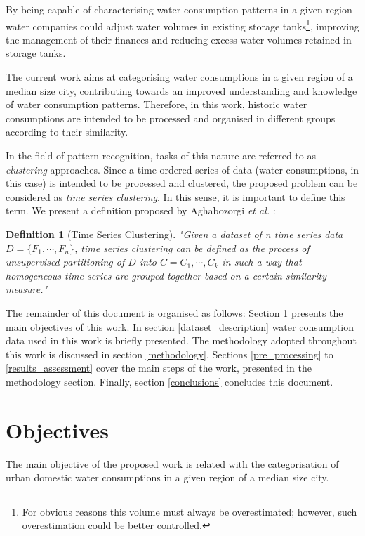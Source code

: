 \documentclass[9pt,journal,compsoc]{IEEEtran}
\newtheorem{mydef}{Definition}
\begin{document}
By being capable of characterising water consumption patterns in a given region water companies could adjust water volumes in existing storage tanks\footnote{For obvious reasons this volume must always be overestimated; however, such overestimation could be better controlled.}, improving the management of their finances and reducing excess water volumes retained in storage tanks.

The current work aims at categorising water consumptions in a given region of a median size city, contributing towards an improved understanding and knowledge of water consumption patterns. Therefore, in this work, historic water consumptions are intended to be processed and organised in different groups according to their similarity.

In the field of pattern recognition, tasks of this nature are referred to as \emph{clustering} approaches. Since a time-ordered series of data (water consumptions, in this case) is intended to be processed and clustered, the proposed problem can be considered as \emph{time series clustering}. In this sense, it is important to define this term. We present a definition proposed by Aghabozorgi \emph{et al.} \cite{aghabozorgi2015time}:

\begin{mydef}[Time Series Clustering]
	"Given a dataset of n time series data $D = \{F_{1}, \cdots , F_{n}\}$, time series clustering can be defined as the process of unsupervised partitioning of $D$ into $C = {C_{1}, \cdots , C_{k}}$ in such a way that homogeneous time series are grouped together based on a certain similarity measure."
\end{mydef}

The remainder of this document is organised as follows: Section \ref{objectives} presents the main objectives of this work. In section \ref{dataset_description} water consumption data used in this work is briefly presented. The methodology adopted throughout this work is discussed in section \ref{methodology}. Sections \ref{pre_processing} to \ref{results_assessment} cover the main steps of the work, presented in the methodology section. Finally, section \ref{conclusions} concludes this document.

\section{Objectives}
\label{objectives}

The main objective of the proposed work is related with the categorisation of urban domestic water consumptions in a given region of a median size city.
\end{document}
